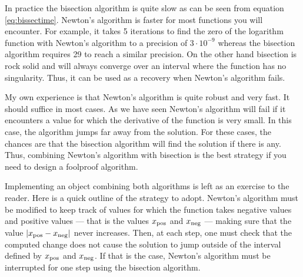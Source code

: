 \documentclass[twoside]{book}
\begin{document}
In practice the bisection algorithm is quite slow as can be seen
from equation \ref{eq:bissectime}. Newton's algorithm is faster
for most functions you will encounter. For example, it takes 5
iterations to find the zero of the logarithm function with
Newton's algorithm to a precision of $3\cdot 10^{-9}$ whereas the
bisection algorithm requires 29 to reach a similar precision. On
the other hand bisection is rock solid and will always converge
over an interval where the function has no singularity. Thus, it
can be used as a recovery when Newton's algorithm fails.

My own experience is that Newton's algorithm is quite robust and
very fast. It should suffice in most cases. As we have seen
Newton's algorithm will fail if it encounters a value for which
the derivative of the function is very small. In this case, the
algorithm jumps far away from the solution. For these cases, the
chances are that the bisection algorithm will find the solution if
there is any. Thus, combining Newton's algorithm with bisection is
the best strategy if you need to design a foolproof algorithm.

Implementing an object combining both algorithms is left as an
exercise to the reader. Here is a quick outline of the strategy to
adopt. Newton's algorithm must be modified to keep track of values
for which the function takes negative values and positive values
--- that is the values $x_{\mathop{\rm pos}}$ and $x_{\mathop{\rm neg}}$
--- making sure that the value $\left| x_{\mathop{\rm pos}}-x_{\mathop{\rm neg}}\right|$
never increases. Then, at each step, one must check that the
computed change does not cause the solution to jump outside of the
interval defined by $x_{\mathop{\rm pos}}$ and $x_{\mathop{\rm
neg}}$. If that is the case, Newton's algorithm must be
interrupted for one step using the bisection algorithm.

\ifx\wholebook\relax\else
\end{document}
